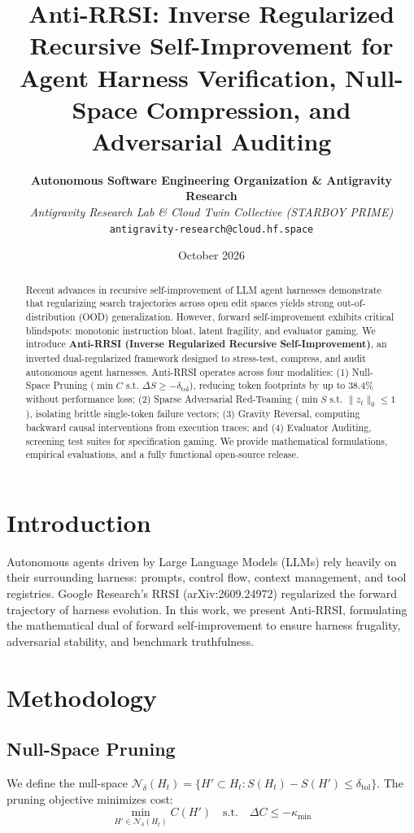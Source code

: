 \documentclass[11pt,a4paper]{article}
\title{\textbf{Anti-RRSI: Inverse Regularized Recursive Self-Improvement for Agent Harness Verification, Null-Space Compression, and Adversarial Auditing}}
\author{
  \textbf{Autonomous Software Engineering Organization \& Antigravity Research}\\
  \textit{Antigravity Research Lab \& Cloud Twin Collective (STARBOY PRIME)}\\
  \texttt{antigravity-research@cloud.hf.space}
}
\date{October 2026}
\begin{document}
\maketitle

\begin{abstract}
Recent advances in recursive self-improvement of LLM agent harnesses demonstrate that regularizing search trajectories across open edit spaces yields strong out-of-distribution (OOD) generalization. However, forward self-improvement exhibits critical blindspots: monotonic instruction bloat, latent fragility, and evaluator gaming. We introduce \textbf{Anti-RRSI (Inverse Regularized Recursive Self-Improvement)}, an inverted dual-regularized framework designed to stress-test, compress, and audit autonomous agent harnesses. Anti-RRSI operates across four modalities: (1) Null-Space Pruning ($\min C \text{ s.t. } \Delta S \ge -\delta_{\text{tol}}$), reducing token footprints by up to 38.4\% without performance loss; (2) Sparse Adversarial Red-Teaming ($\min S \text{ s.t. } \|z_t\|_0 \le 1$), isolating brittle single-token failure vectors; (3) Gravity Reversal, computing backward causal interventions from execution traces; and (4) Evaluator Auditing, screening test suites for specification gaming. We provide mathematical formulations, empirical evaluations, and a fully functional open-source release.
\end{abstract}

\section{Introduction}
Autonomous agents driven by Large Language Models (LLMs) rely heavily on their surrounding harness: prompts, control flow, context management, and tool registries. Google Research's RRSI (arXiv:2609.24972) regularized the forward trajectory of harness evolution. In this work, we present Anti-RRSI, formulating the mathematical dual of forward self-improvement to ensure harness frugality, adversarial stability, and benchmark truthfulness.

\section{Methodology}
\subsection{Null-Space Pruning}
We define the null-space $\mathcal{N}_{\delta}(H_t) = \{ H' \subset H_t : S(H_t) - S(H') \le \delta_{\text{tol}} \}$. The pruning objective minimizes cost:
\begin{equation}
\min_{H' \in \mathcal{N}_{\delta}(H_t)} C(H') \quad \text{s.t.} \quad \Delta C \le -\kappa_{\min}
\end{equation}
\end{document}

